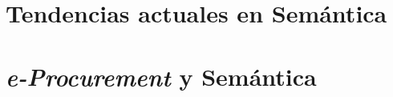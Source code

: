 
\newpage

\section{\label{capitulo:eproc-sm}Tendencias actuales en Semántica} 

\section{\label{capitulo:eproc-sm}\textit{e-Procurement} y Semántica} 

